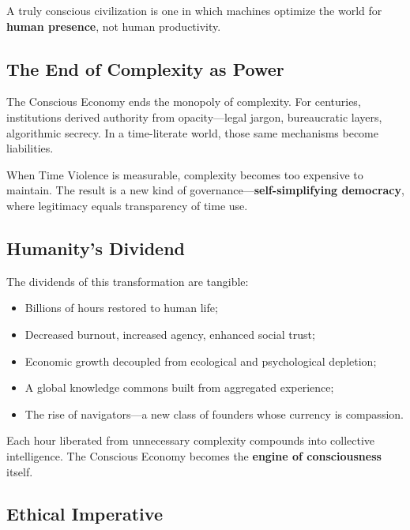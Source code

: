 A truly conscious civilization is one in which machines optimize the world for \textbf{human presence}, not human productivity.

\subsection{The End of Complexity as Power}
\label{sec:end-complexity}

The Conscious Economy ends the monopoly of complexity. For centuries, institutions derived authority from opacity—legal jargon, bureaucratic layers, algorithmic secrecy. In a time-literate world, those same mechanisms become liabilities.

When Time Violence is measurable, complexity becomes too expensive to maintain. The result is a new kind of governance—\textbf{self-simplifying democracy}, where legitimacy equals transparency of time use.

\subsection{Humanity's Dividend}
\label{sec:humanity-dividend}

The dividends of this transformation are tangible:

\begin{itemize}
    \item Billions of hours restored to human life;
    \item Decreased burnout, increased agency, enhanced social trust;
    \item Economic growth decoupled from ecological and psychological depletion;
    \item A global knowledge commons built from aggregated experience;
    \item The rise of navigators—a new class of founders whose currency is compassion.
\end{itemize}

Each hour liberated from unnecessary complexity compounds into collective intelligence. The Conscious Economy becomes the \textbf{engine of consciousness} itself.

\subsection{Ethical Imperative}
\label{sec:ethical-imperative}

